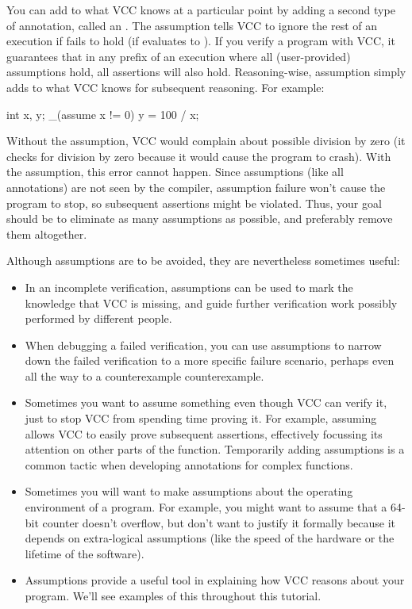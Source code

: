 You can add to what VCC knows at a particular point by adding a second
type of annotation, called an .
The assumption  tells VCC to ignore
the rest of an execution if  fails to hold (\ie if
 evaluates to ). If you verify a
program with VCC, it guarantees that in any prefix of an execution
where all (user-provided) assumptions hold, all assertions will also hold.
Reasoning-wise, assumption simply adds  to what VCC
knows for subsequent reasoning. For example:
\begin{VCC}
int x, y;
_(assume x != 0)
y = 100 / x;
\end{VCC}
Without the assumption, VCC would complain about possible division by
zero (it checks for division by zero because it would cause the
program to crash).  With the assumption, this error cannot happen.  
Since assumptions (like all annotations) are not seen by the compiler,
assumption failure won't cause the program to stop, so subsequent assertions
might be violated.  
Thus, your goal should be to eliminate as many assumptions as possible, and
preferably remove them altogether.

Although assumptions are to be avoided, they are nevertheless
sometimes useful:
\begin{itemize}
\item In an incomplete verification, assumptions can be used
  to mark the knowledge that VCC is missing, and guide further verification
  work possibly performed by different people.

\item When debugging a failed verification, you can use assumptions to
  narrow down the failed verification to a more specific failure
  scenario, perhaps even all the way to a counterexample counterexample. 

\item Sometimes you want to assume something even though VCC can
  verify it, just to stop VCC from spending time proving it. For
  example, assuming \vcc{\false} allows VCC to 
  easily prove subsequent assertions, effectively focussing its
  attention on other parts of the function. Temporarily adding assumptions
  is a common tactic when developing annotations for complex functions.

\item Sometimes you will want to make assumptions about the operating
  environment of a program. For example, you might want to assume that
  a 64-bit counter doesn't overflow, but don't want to justify it
  formally because it depends on extra-logical assumptions (like the
  speed of the hardware or the lifetime of the software). 
\item Assumptions provide a useful tool in explaining how VCC
  reasons about your program. We'll see examples of this throughout
  this tutorial.
\end{itemize}

